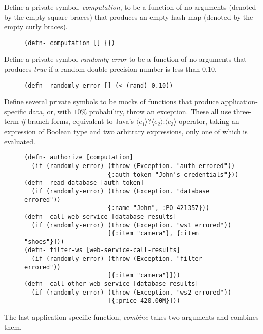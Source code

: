 \documentclass[11pt]{article}
\begin{document}
Define a private symbol, \emph{computation}, to be a function of no
arguments (denoted by the empty square braces) that produces an
empty hash-map (denoted by the empty curly braces).

\begin{figure}[H]
\label{functional-helpers-2}
\begin{verbatim}
(defn- computation [] {})
\end{verbatim}
\end{figure}

Define a private symbol \emph{randomly-error} to be a function of no
arguments that produces \emph{true} if a random double-precision number
is less than $0.10$.

\begin{figure}[H]
\label{functional-helpers-3}
\begin{verbatim}
(defn- randomly-error [] (< (rand) 0.10))
\end{verbatim}
\end{figure}

Define several private symbols to be mocks of functions that produce
application-specific data, or, with $10\%$ probability, throw an
exception. These all use three-term \emph{if}-branch forms, equivalent to Java's
$\langle{}e_1\rangle{}\texttt{?}\langle{}e_2\rangle{}\texttt{:}\langle{}e_3\rangle{}$
operator, taking an expression of Boolean type and two arbitrary
expressions, only one of which is evaluated.

\begin{figure}[H]
\label{functional-helpers-4}
\begin{verbatim}
(defn- authorize [computation]
  (if (randomly-error) (throw (Exception. "auth errored"))
                       {:auth-token "John's credentials"}))
(defn- read-database [auth-token]
  (if (randomly-error) (throw (Exception. "database errored"))
                       {:name "John", :PO 421357}))
(defn- call-web-service [database-results]
  (if (randomly-error) (throw (Exception. "ws1 errored"))
                       [{:item "camera"}, {:item "shoes"}]))
(defn- filter-ws [web-service-call-results]
  (if (randomly-error) (throw (Exception. "filter errored"))
                       [{:item "camera"}]))
(defn- call-other-web-service [database-results]
  (if (randomly-error) (throw (Exception. "ws2 errored"))
                       [{:price 420.00M}]))
\end{verbatim}
\end{figure}

The last application-specific function, \emph{combine} takes two
arguments and combines them.
\end{document}
